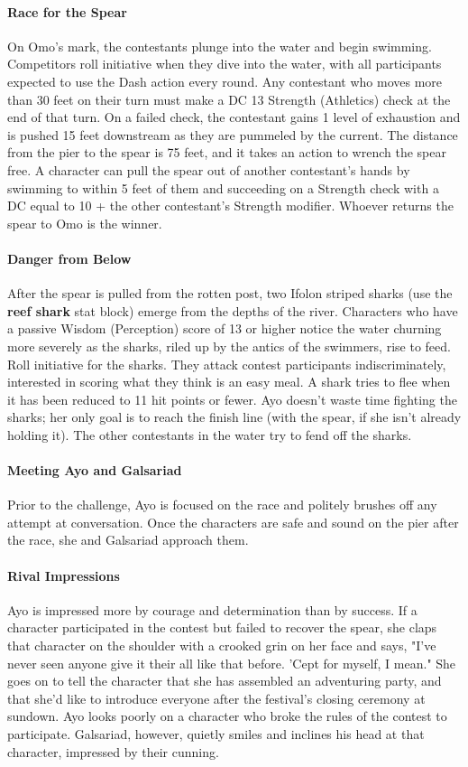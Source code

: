 \documentclass[10pt,a4,twoside,twocolumn,openany,nodeprecatedcode]{dndbook}
\begin{document}
\paragraph{Race for the Spear}
On Omo's mark, the contestants plunge into the water and begin swimming. Competitors roll initiative when they dive into the water, with all participants expected to use the Dash action every round. Any contestant who moves more than 30 feet on their turn must make a DC 13 Strength (Athletics) check at the end of that turn. On a failed check, the contestant gains 1 level of exhaustion and is pushed 15 feet downstream as they are pummeled by the current.
The distance from the pier to the spear is 75 feet, and it takes an action to wrench the spear free. A character can pull the spear out of another contestant's hands by swimming to within 5 feet of them and succeeding on a Strength check with a DC equal to 10 + the other contestant's Strength modifier. Whoever returns the spear to Omo is the winner.
\paragraph{Danger from Below}
After the spear is pulled from the rotten post, two Ifolon striped sharks (use the \textbf{reef shark} stat block) emerge from the depths of the river. Characters who have a passive Wisdom (Perception) score of 13 or higher notice the water churning more severely as the sharks, riled up by the antics of the swimmers, rise to feed.
Roll initiative for the sharks. They attack contest participants indiscriminately, interested in scoring what they think is an easy meal. A shark tries to flee when it has been reduced to 11 hit points or fewer. Ayo doesn't waste time fighting the sharks; her only goal is to reach the finish line (with the spear, if she isn't already holding it). The other contestants in the water try to fend off the sharks.
\paragraph{Meeting Ayo and Galsariad}
Prior to the challenge, Ayo is focused on the race and politely brushes off any attempt at conversation. Once the characters are safe and sound on the pier after the race, she and Galsariad approach them.
\paragraph{Rival Impressions}
Ayo is impressed more by courage and determination than by success. If a character participated in the contest but failed to recover the spear, she claps that character on the shoulder with a crooked grin on her face and says, "I've never seen anyone give it their all like that before. 'Cept for myself, I mean." She goes on to tell the character that she has assembled an adventuring party, and that she'd like to introduce everyone after the festival's closing ceremony at sundown.
Ayo looks poorly on a character who broke the rules of the contest to participate. Galsariad, however, quietly smiles and inclines his head at that character, impressed by their cunning.
\end{document}

